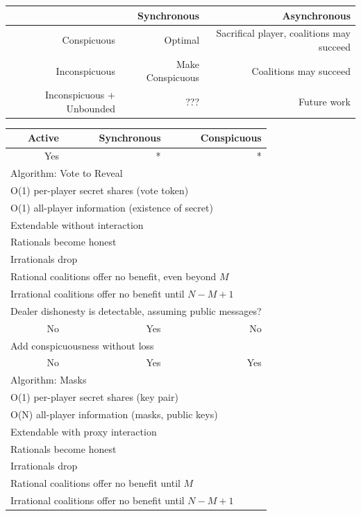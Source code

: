 \documentclass{dalcsthesis}
\begin{document}
\begin{tabular}{|r|r|r|}
\hline
							& Synchronous 					& Asynchronous\\
\hline
Conspicuous					& Optimal						& Sacrifical player, coalitions may succeed\\
Inconspicuous				& Make Conspicuous				& Coalitions may succeed\\
Inconspicuous + Unbounded	& ???							& Future work\\
\hline
\end{tabular}
\begin{tabular}{|r|r|r|}
\hline
Active & Synchronous & Conspicuous\\
\hline
Yes	& *		& *		\\
\multicolumn{3}{|l|}{Algorithm: Vote to Reveal}\\
\multicolumn{3}{|l|}{O(1) per-player secret shares (vote token)}\\
\multicolumn{3}{|l|}{O(1) all-player information (existence of secret)}\\
\multicolumn{3}{|l|}{Extendable without interaction}\\
\multicolumn{3}{|l|}{Rationals become honest}\\
\multicolumn{3}{|l|}{Irrationals drop}\\
\multicolumn{3}{|l|}{Rational coalitions offer no benefit, even beyond $M$}\\
\multicolumn{3}{|l|}{Irrational coalitions offer no benefit until $N-M+1$}\\
\multicolumn{3}{|l|}{Dealer dishonesty is detectable, assuming public messages?}\\
\hline
No	& Yes	& No \\
\multicolumn{3}{|l|}{Add conspicuousness without loss}\\
\hline
No	& Yes	& Yes \\
\multicolumn{3}{|l|}{Algorithm: Masks}\\
\multicolumn{3}{|l|}{O(1) per-player secret shares (key pair)}\\
\multicolumn{3}{|l|}{O(N) all-player information (masks, public keys)}\\
\multicolumn{3}{|l|}{Extendable with proxy interaction}\\
\multicolumn{3}{|l|}{Rationals become honest}\\
\multicolumn{3}{|l|}{Irrationals drop}\\
\multicolumn{3}{|l|}{Rational coalitions offer no benefit until $M$}\\
\multicolumn{3}{|l|}{Irrational coalitions offer no benefit until $N-M+1$}\\

\end{tabular}
\end{document}
